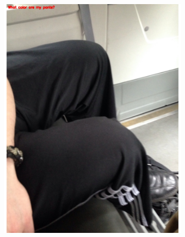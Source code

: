 \documentclass[sigconf]{acmart}
\begin{document}
\begin{figure}[hbp]
        \centering
        \begin{subfigure}[b]{0.3\columnwidth}
                \includegraphics[width=\textwidth]{images/color_1.pdf}  
        \end{subfigure}%
        ~ 
        \begin{subfigure}[b]{0.3\columnwidth}

\end{subfigure}
\end{figure}
\end{document}

